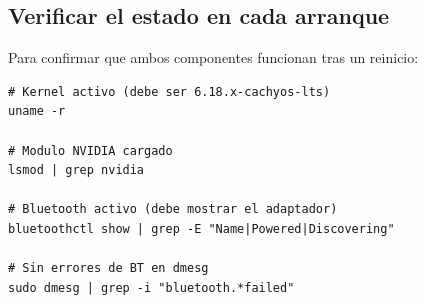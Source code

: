 \documentclass[12pt,a4paper]{article}
\begin{document}
\subsection{Verificar el estado en cada arranque}

Para confirmar que ambos componentes funcionan tras un reinicio:

\begin{lstlisting}[style=bash]
# Kernel activo (debe ser 6.18.x-cachyos-lts)
uname -r

# Modulo NVIDIA cargado
lsmod | grep nvidia

# Bluetooth activo (debe mostrar el adaptador)
bluetoothctl show | grep -E "Name|Powered|Discovering"

# Sin errores de BT en dmesg
sudo dmesg | grep -i "bluetooth.*failed"
\end{lstlisting}
\end{document}
